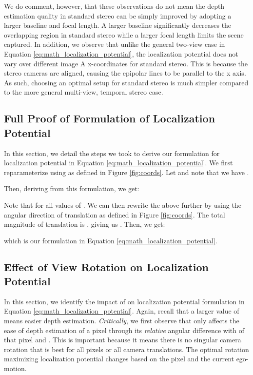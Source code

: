 \documentclass[runningheads, hyperfootnotes=false]{article}
\begin{document}
We do comment, however, that these observations do not mean the depth estimation quality in standard stereo can be simply improved by adopting a larger baseline and focal length. A larger baseline significantly decreases the overlapping region in standard stereo while a larger focal length limits the scene captured. In addition, we observe that unlike the general two-view case in Equation \ref{eq:math_localization_potential}, the localization potential does not vary over different image A x-coordinates for standard stereo. This is because the stereo cameras are aligned, causing the epipolar lines to be parallel to the x axis. As such, choosing an optimal setup for standard stereo is much simpler compared to the more general multi-view, temporal stereo case.

\subsection{Full Proof of Formulation of Localization Potential}\label{app:theory_loc_potential}
In this section, we detail the steps we took to derive our formulation for localization potential in Equation \ref{eq:math_localization_potential}. We first reparameterize  using  as defined in Figure \ref{fig:coords}. Let  and note that we have . 

Then, deriving  from this formulation, we get:

Note that  for all values of . We can then rewrite the above further by using the angular direction of translation  as defined in Figure \ref{fig:coords}. The total magnitude of translation is , giving us . Then, we get:

which is our formulation in Equation \ref{eq:math_localization_potential}.

\subsection{Effect of View Rotation  on Localization Potential}\label{app:theory_rot}
In this section, we identify the impact of  on localization potential formulation in Equation \ref{eq:math_localization_potential}. Again, recall that a larger value of  means easier depth estimation. \textit{Critically}, we first observe that  only affects the ease of depth estimation of a pixel through its \textit{relative} angular difference with  of that pixel and . This is important because it means there is no singular camera rotation that is best for all pixels or all camera translations. The optimal rotation maximizing localization potential changes based on the pixel and the current ego-motion.
\end{document}

